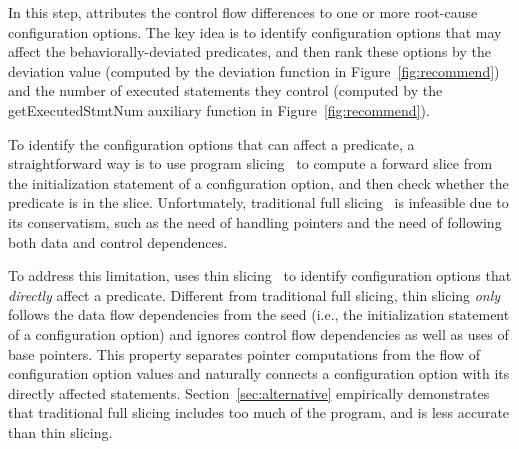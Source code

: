 



In this step, \ourtool attributes the control flow differences
to one or more root-cause configuration options.
The key idea is to identify configuration options that
may affect the behaviorally-deviated predicates, and then rank
these options by
the deviation value (computed by the
{deviation} function in Figure~\ref{fig:recommend})
and the number of executed statements they control (computed
by the {getExecutedStmtNum} auxiliary function in Figure~\ref{fig:recommend}).


To identify the configuration options that can affect
a predicate, a straightforward way is to use program slicing~\cite{Weiser:1981}
to compute a forward slice from the initialization statement
of a configuration option, and then check whether the predicate is
in the slice. Unfortunately, traditional
full slicing~\cite{Weiser:1981} is infeasible due
to its conservatism, such as the need of handling pointers
and the need of following both data and control dependences.


To address this limitation, \ourtool uses thin slicing~\cite{Sridharan:2007}
to identify configuration options that \textit{directly} affect
a predicate. Different from traditional full slicing,
thin slicing \textit{only} follows the data flow dependencies
from the seed (i.e., the initialization statement of a
configuration option) and ignores control flow dependencies
as well as uses of base pointers. This property separates
pointer computations from the flow of configuration option
values and naturally connects a configuration option with its
directly affected statements. Section~\ref{sec:alternative}
empirically demonstrates that traditional full slicing includes
too much of the program, and is less accurate than
thin slicing.


